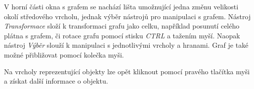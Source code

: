\documentclass[12pt,a4paper]{report}
\begin{document}
V horní části okna s grafem se nachází lišta umožnující jedna změnu velikosti okolí středového vrcholu, jednak výběr nástrojů pro manipulaci s grafem. Nástroj \emph{Transformace} složí k transformaci grafu jako celku, například posunutí celého plátna s grafem, či rotace grafu pomocí stisku \emph{CTRL} a tažením myší. Naopak nástroj \emph{Výběr} slouží k manipulaci s jednotlivými vrcholy a hranami. Graf je také možné přibližovat pomocí kolečka myši.

Na vrcholy reprezentující objekty lze opět kliknout pomocí pravého tlačítka myši a získat další informace o objektu.

\end{document}
